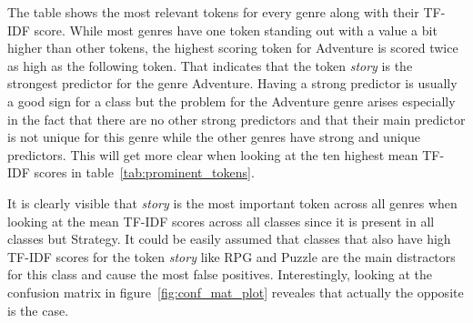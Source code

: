 \documentclass[11pt, a4paper]{article}
\begin{document}
The table shows the most relevant tokens for every genre along with their TF-IDF score.
While most genres have one token standing out with a value a bit higher than other tokens, the highest scoring token for
Adventure is scored twice as high as the following token.
That indicates that the token \textit{story} is the strongest predictor for the genre Adventure.
Having a strong predictor is usually a good sign for a class but the problem for the Adventure genre arises especially in
the fact that there are no other strong predictors and that their main predictor is not unique for this genre while
the other genres have strong and unique predictors.
This will get more clear when looking at the ten highest mean TF-IDF scores in table~\ref{tab:prominent_tokens}.



It is clearly visible that \textit{story} is the most important token across all genres when looking at the mean TF-IDF
scores across all classes since it is present in all classes but Strategy.
It could be easily assumed that classes that also have high TF-IDF scores for the token \textit{story} like RPG and
Puzzle are the main distractors for this class and cause the most false positives.
Interestingly, looking at the confusion matrix in figure~\ref{fig:conf_mat_plot} reveales that actually the opposite
is the case.


\end{document}
